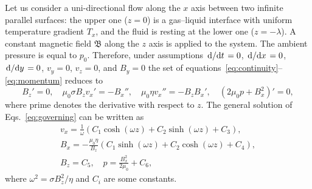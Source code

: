 \documentclass{article}
\begin{document}
Let us consider a uni-directional flow along the $x$ axis between two infinite parallel surfaces:
the upper one ($z=0$) is a gas--liquid interface with uniform temperature gradient $T_x$,
and the fluid is resting at the lower one ($z=-\lambda$).
A constant magnetic field $\mathfrak{B}$ along the $z$ axis is applied to the system.
The ambient pressure is equal to $p_0$.
Therefore, under assumptions $\dv*{t}=0$, $\dv*{x}=0$, $\dv*{y}=0$, $v_y=0$, $v_z=0$,
and $B_y=0$ the set of equations~\eqref{eq:continuity}--\eqref{eq:momentum} reduces to
\begin{equation}\label{eq:governing}
    B_z' = 0, \quad \mu_0\sigma B_z v_x' = -B_x'', \quad
    \mu_0\eta v_x'' = -B_z B_x', \quad (2\mu_0 p + B_x^2)'=0,
\end{equation}
where prime denotes the derivative with respect to $z$.
The general solution of Eqs.~\eqref{eq:governing} can be written as
\begin{gather}
    v_x = \frac1\omega(C_1\cosh(\omega z) + C_2\sinh(\omega z) + C_3),
        \label{eq:general1}\\
    B_x = -\frac{\mu_0\eta}{B_z}(C_1\sinh(\omega z) + C_2\cosh(\omega z) + C_4),
        \label{eq:general2}\\
    B_z = C_5, \quad  p = \frac{B_x^2}{2\mu_0} + C_6, \label{eq:general3}
\end{gather}
where $\omega^2 = \sigma B_z^2/\eta$ and $C_i$ are some constants.
\end{document}
